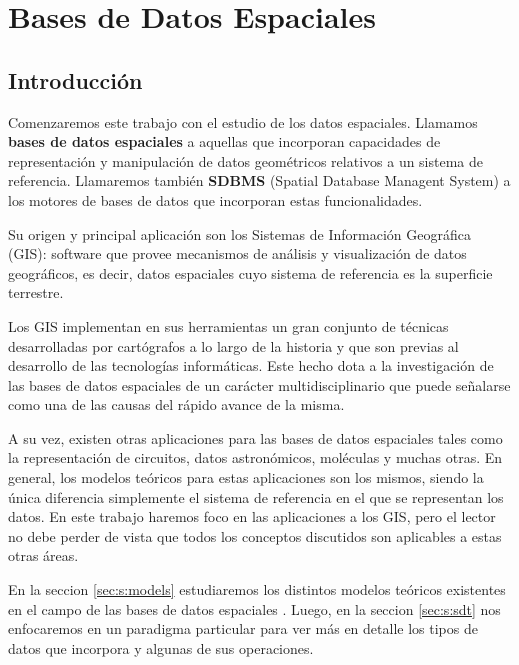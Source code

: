\newcommand{\concept}{\textbf}

\chapter{Bases de Datos Espaciales}  \label{cap:e}

\section{Introducción}

Comenzaremos este trabajo con el estudio de los datos espaciales. Llamamos \concept{bases de datos espaciales} a aquellas que incorporan capacidades de representación y manipulación de datos geométricos relativos a un sistema de referencia. Llamaremos también \concept{SDBMS} (Spatial Database Managent System) a los motores de bases de datos que incorporan estas funcionalidades.

Su origen y principal aplicación son los Sistemas de Información Geográfica (GIS): software que provee mecanismos de análisis y visualización de datos geográficos, es decir, datos espaciales cuyo sistema de referencia  es la superficie terrestre.

Los GIS implementan en sus herramientas un gran conjunto de técnicas desarrolladas por cartógrafos a lo largo de la historia y que son previas al desarrollo de las tecnologías informáticas. Este hecho dota a la investigación de las bases de datos espaciales de un carácter multidisciplinario que puede señalarse como una de las causas del rápido avance de la misma.

A su vez, existen otras aplicaciones para las bases de datos espaciales tales como la representación de circuitos, datos astronómicos, moléculas y muchas otras.
En general, los modelos teóricos para estas aplicaciones son los mismos, siendo la única diferencia simplemente el sistema de referencia en el que se representan los datos.
En este trabajo haremos foco en las aplicaciones a los GIS, pero el lector no debe perder de vista que todos los conceptos discutidos son aplicables a estas otras áreas.

En la seccion \ref{sec:s:models} estudiaremos los distintos modelos teóricos existentes en el campo de las bases de datos espaciales . Luego, en la seccion \ref{sec:s:sdt} nos enfocaremos en un paradigma particular para ver más en detalle los tipos de datos que incorpora y algunas de sus operaciones.

